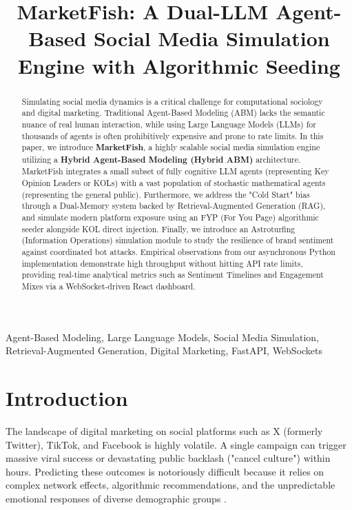 \documentclass[conference]{IEEEtran}
\begin{document}
\title{MarketFish: A Dual-LLM Agent-Based Social Media Simulation Engine with Algorithmic Seeding}

\author{
}

\maketitle

\begin{abstract}
Simulating social media dynamics is a critical challenge for computational sociology and digital marketing. Traditional Agent-Based Modeling (ABM) lacks the semantic nuance of real human interaction, while using Large Language Models (LLMs) for thousands of agents is often prohibitively expensive and prone to rate limits. In this paper, we introduce \textbf{MarketFish}, a highly scalable social media simulation engine utilizing a \textbf{Hybrid Agent-Based Modeling (Hybrid ABM)} architecture. MarketFish integrates a small subset of fully cognitive LLM agents (representing Key Opinion Leaders or KOLs) with a vast population of stochastic mathematical agents (representing the general public). Furthermore, we address the "Cold Start" bias through a Dual-Memory system backed by Retrieval-Augmented Generation (RAG), and simulate modern platform exposure using an FYP (For You Page) algorithmic seeder alongside KOL direct injection. Finally, we introduce an Astroturfing (Information Operations) simulation module to study the resilience of brand sentiment against coordinated bot attacks. Empirical observations from our asynchronous Python implementation demonstrate high throughput without hitting API rate limits, providing real-time analytical metrics such as Sentiment Timelines and Engagement Mixes via a WebSocket-driven React dashboard.
\end{abstract}

\begin{IEEEkeywords}
Agent-Based Modeling, Large Language Models, Social Media Simulation, Retrieval-Augmented Generation, Digital Marketing, FastAPI, WebSockets
\end{IEEEkeywords}

\section{Introduction}
The landscape of digital marketing on social platforms such as X (formerly Twitter), TikTok, and Facebook is highly volatile. A single campaign can trigger massive viral success or devastating public backlash ("cancel culture") within hours. Predicting these outcomes is notoriously difficult because it relies on complex network effects, algorithmic recommendations, and the unpredictable emotional responses of diverse demographic groups \cite{b1}.
\end{document}
